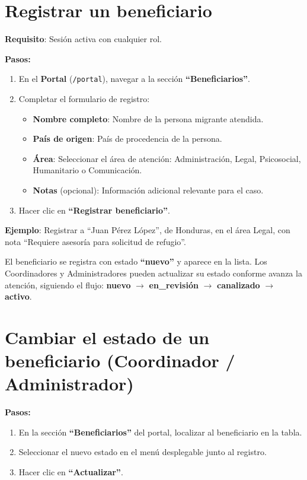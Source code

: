 \documentclass[10pt,letterpaper]{report}
\begin{document}
\section{Registrar un beneficiario}

\textbf{Requisito}: Sesión activa con cualquier rol.

\textbf{Pasos:}
\begin{enumerate}[leftmargin=2cm]
  \item En el \textbf{Portal} (\texttt{/portal}), navegar a la sección \textbf{``Beneficiarios''}.
  \item Completar el formulario de registro:
  \begin{itemize}
    \item \textbf{Nombre completo}: Nombre de la persona migrante atendida.
    \item \textbf{País de origen}: País de procedencia de la persona.
    \item \textbf{Área}: Seleccionar el área de atención: Administración, Legal, Psicosocial, Humanitario o Comunicación.
    \item \textbf{Notas} (opcional): Información adicional relevante para el caso.
  \end{itemize}
  \item Hacer clic en \textbf{``Registrar beneficiario''}.
\end{enumerate}

\textbf{Ejemplo}: Registrar a ``Juan Pérez López'', de Honduras, en el área Legal, con nota ``Requiere asesoría para solicitud de refugio''.

\begin{successbox}
  El beneficiario se registra con estado \textbf{``nuevo''} y aparece en la lista. Los Coordinadores y Administradores pueden actualizar su estado conforme avanza la atención, siguiendo el flujo: \textbf{nuevo} $\rightarrow$ \textbf{en\_revisión} $\rightarrow$ \textbf{canalizado} $\rightarrow$ \textbf{activo}.
\end{successbox}

\section{Cambiar el estado de un beneficiario (Coordinador / Administrador)}

\textbf{Pasos:}
\begin{enumerate}[leftmargin=2cm]
  \item En la sección \textbf{``Beneficiarios''} del portal, localizar al beneficiario en la tabla.
  \item Seleccionar el nuevo estado en el menú desplegable junto al registro.
  \item Hacer clic en \textbf{``Actualizar''}.
\end{enumerate}
\end{document}
